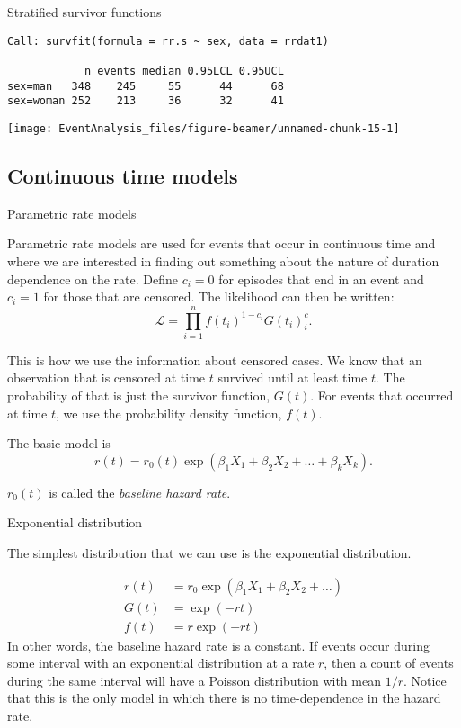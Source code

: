 \documentclass[10pt,ignorenonframetext,]{beamer}
\begin{document}
\begin{frame}[fragile]{Stratified survivor functions}

\begin{verbatim}
Call: survfit(formula = rr.s ~ sex, data = rrdat1)

            n events median 0.95LCL 0.95UCL
sex=man   348    245     55      44      68
sex=woman 252    213     36      32      41
\end{verbatim}

\begin{center}\texttt{[image: EventAnalysis\_files/figure-beamer/unnamed-chunk-15-1]} \end{center}

\end{frame}

\subsection{Continuous time models}\label{continuous-time-models}

\begin{frame}{Parametric rate models}

Parametric rate models are used for events that occur in continuous time
and where we are interested in finding out something about the nature of
duration dependence on the rate. Define \(c_i = 0\) for episodes that
end in an event and \(c_i=1\) for those that are censored. The
likelihood can then be written: \[
\mathcal{L} = \prod_{i=1}^n f(t_i)^{1-c_i} G(t_i)^c_i.
\]

This is how we use the information about censored cases. We know that an
observation that is censored at time \(t\) survived until at least time
\(t\). The probability of that is just the survivor function, \(G(t)\).
For events that occurred at time \(t\), we use the probability density
function, \(f(t)\).

The basic model is \[
r(t) = r_0(t) \exp(\beta_1 X_1 + \beta_2 X_2 + \dots + \beta_k X_k).
\]

\(r_0(t)\) is called the \emph{baseline hazard rate}.

\end{frame}

\begin{frame}{Exponential distribution}

The simplest distribution that we can use is the exponential
distribution.

\[
\begin{aligned}
r(t) &= r_0 \exp(\beta_1 X_1 + \beta_2 X_2 + \dots)\\
G(t) &= \exp(-r t)\\
f(t) &= r \exp(-r t)
\end{aligned}
\] In other words, the baseline hazard rate is a constant. If events
occur during some interval with an exponential distribution at a rate
\(r\), then a count of events during the same interval will have a
Poisson distribution with mean \(1/r\). Notice that this is the only
model in which there is no time-dependence in the hazard rate.

\end{frame}
\end{document}
